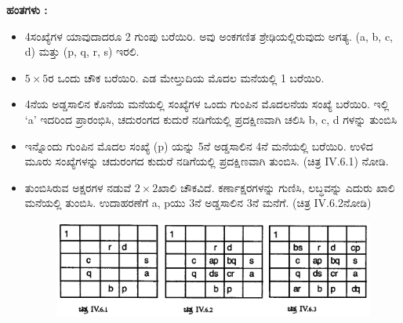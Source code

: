 \textbf{ಹಂತಗಳು :}
\begin{itemize}
	\item 4ಸಂಖ್ಯೆಗಳ ಯಾವುದಾದರೂ 2 ಗುಂಪು ಬರೆಯಿರಿ. ಅವು ಅಂಕಗಣಿತ ಶ್ರೇಢಿಯಲ್ಲಿರುವುದು ಅಗತ್ಯ. (a, b, c, d) ಮತ್ತು (p, q, r, s) ಇರಲಿ.
	\item $5 \times 5$ರ ಒಂದು ಚೌಕ ಬರೆಯಿರಿ. ಎಡ ಮೇಲ್ತುದಿಯ ಮೊದಲ ಮನೆಯಲ್ಲಿ 1 ಬರೆಯಿರಿ.
	\item 4ನೆಯ ಅಡ್ಡಸಾಲಿನ ಕೊನೆಯ ಮನೆಯಲ್ಲಿ ಸಂಖ್ಯೆಗಳ ಒಂದು ಗುಂಪಿನ ಮೊದಲನೆಯ ಸಂಖ್ಯೆ ಬರೆಯಿರಿ. ಇಲ್ಲಿ `a’ ಇದರಿಂದ ಪ್ರಾರಂಭಿಸಿ, ಚದುರಂಗದ ಕುದುರೆ ನಡಿಗೆಯಲ್ಲಿ ಪ್ರದಕ್ಷಿಣವಾಗಿ ಚಲಿಸಿ b, c, d ಗಳನ್ನು ತುಂಬಿಸಿ
	\item ಇನ್ನೊಂದು ಗುಂಪಿನ ಮೊದಲ ಸಂಖ್ಯೆ (p) ಯನ್ನು 5ನೆ ಅಡ್ಡಸಾಲಿನ 4ನೆ ಮನೆಯಲ್ಲಿ ಬರೆಯಿರಿ. ಉಳಿದ ಮೂರು ಸಂಖ್ಯೆಗಳನ್ನು ಚದುರಂಗದ ಕುದುರೆ ನಡಿಗೆಯಲ್ಲಿ ಪ್ರದಕ್ಷಿಣವಾಗಿ ತುಂಬಿಸಿ. (ಚಿತ್ರ IV.6.1) ನೋಡಿ.
	\item ತುಂಬಿಸಿರುವ ಅಕ್ಷರಗಳ ನಡುವೆ $2 \times 2$ಖಾಲಿ ಚೌಕವಿದೆ. ಕರ್ಣಾಕ್ಷರಗಳನ್ನು ಗುಣಿಸಿ, ಲಬ್ಧವನ್ನು ಎದುರು ಖಾಲಿ ಮನೆಯಲ್ಲಿ ತುಂಬಿಸಿ. ಉದಾಹರಣೆಗೆ a, pಯು  3ನೆ ಅಡ್ಡಸಾಲಿನ 3ನೆ ಮನೆಗೆ. (ಚಿತ್ರ IV.6.2ನೋಡಿ)
	\begin{figure}[H]
	\includegraphics[scale=.8]{src/figures/chap7/fig7.28.jpg}
	\end{figure}


\end{itemize}

